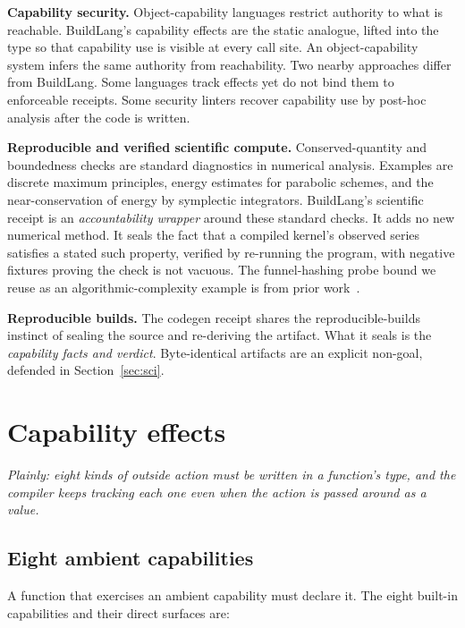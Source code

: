 \documentclass[11pt]{article}
\begin{document}
\textbf{Capability security.} Object-capability languages restrict authority to what is reachable. BuildLang's capability effects are the static analogue, lifted into the type so that capability use is visible at every call site. An object-capability system infers the same authority from reachability. Two nearby approaches differ from BuildLang. Some languages track effects yet do not bind them to enforceable receipts. Some security linters recover capability use by post-hoc analysis after the code is written.

\textbf{Reproducible and verified scientific compute.} Conserved-quantity and boundedness checks are standard diagnostics in numerical analysis. Examples are discrete maximum principles, energy estimates for parabolic schemes, and the near-conservation of energy by symplectic integrators. BuildLang's scientific receipt is an \emph{accountability wrapper} around these standard checks. It adds no new numerical method. It seals the fact that a compiled kernel's observed series satisfies a stated such property, verified by re-running the program, with negative fixtures proving the check is not vacuous. The funnel-hashing probe bound we reuse as an algorithmic-complexity example is from prior work~\cite{funnel}.

\textbf{Reproducible builds.} The codegen receipt shares the reproducible-builds~\cite{reproducible} instinct of sealing the source and re-deriving the artifact. What it seals is the \emph{capability facts and verdict}. Byte-identical artifacts are an explicit non-goal, defended in Section~\ref{sec:sci}.

\section{Capability effects}
\label{sec:effects}
\emph{Plainly: eight kinds of outside action must be written in a function's type, and the compiler keeps tracking each one even when the action is passed around as a value.}

\subsection{Eight ambient capabilities}

A function that exercises an ambient capability must declare it. The eight built-in capabilities and their direct surfaces are:
\end{document}
